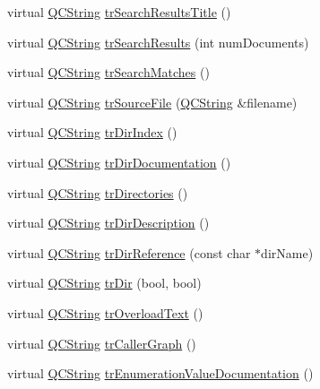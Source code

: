 \begin{DoxyCompactItemize}
virtual \hyperlink{class_q_c_string}{Q\-C\-String} \hyperlink{class_translator_chinese_a711c6a2b5461f1f055d00611ea3a0533}{tr\-Search\-Results\-Title} ()
\item 
virtual \hyperlink{class_q_c_string}{Q\-C\-String} \hyperlink{class_translator_chinese_ae43fbd8a6b08b331a6586422bd8c465e}{tr\-Search\-Results} (int num\-Documents)
\item 
virtual \hyperlink{class_q_c_string}{Q\-C\-String} \hyperlink{class_translator_chinese_a0677855fd52afcda6d47b2cc51e7de31}{tr\-Search\-Matches} ()
\item 
virtual \hyperlink{class_q_c_string}{Q\-C\-String} \hyperlink{class_translator_chinese_a1b3571c6c75d16ebe3763f510bd95b68}{tr\-Source\-File} (\hyperlink{class_q_c_string}{Q\-C\-String} \&filename)
\item 
virtual \hyperlink{class_q_c_string}{Q\-C\-String} \hyperlink{class_translator_chinese_ae9895001e5d8629fd068895b2ffa653f}{tr\-Dir\-Index} ()
\item 
virtual \hyperlink{class_q_c_string}{Q\-C\-String} \hyperlink{class_translator_chinese_a89a223d69d1255271719c256b2fd451b}{tr\-Dir\-Documentation} ()
\item 
virtual \hyperlink{class_q_c_string}{Q\-C\-String} \hyperlink{class_translator_chinese_ab7610b46aedb923a1524272dfbaeab38}{tr\-Directories} ()
\item 
virtual \hyperlink{class_q_c_string}{Q\-C\-String} \hyperlink{class_translator_chinese_abf769d2a217fcf6b9d3b9170fbbae7c8}{tr\-Dir\-Description} ()
\item 
virtual \hyperlink{class_q_c_string}{Q\-C\-String} \hyperlink{class_translator_chinese_ae680136bec0ce1d29a1e4e00d871797f}{tr\-Dir\-Reference} (const char $\ast$dir\-Name)
\item 
virtual \hyperlink{class_q_c_string}{Q\-C\-String} \hyperlink{class_translator_chinese_a243d895180b4c15f7872f6b305d9c7d5}{tr\-Dir} (bool, bool)
\item 
virtual \hyperlink{class_q_c_string}{Q\-C\-String} \hyperlink{class_translator_chinese_ac5436cb286c48cd540d0cdce200a82b9}{tr\-Overload\-Text} ()
\item 
virtual \hyperlink{class_q_c_string}{Q\-C\-String} \hyperlink{class_translator_chinese_ae1d7d38cc426cd25124b1658b1125841}{tr\-Caller\-Graph} ()
\item 
virtual \hyperlink{class_q_c_string}{Q\-C\-String} \hyperlink{class_translator_chinese_a4039294191fddf0e9530b920719998fd}{tr\-Enumeration\-Value\-Documentation} ()
\item 

\end{DoxyCompactItemize}
